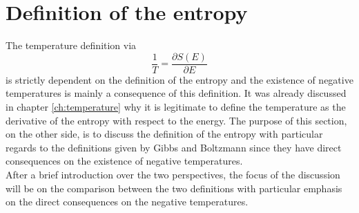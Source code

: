 \chapter{Definition of the entropy}
\label{ch:entropy}
The temperature definition via
\begin{equation*}
    \frac{1}{T} = \frac{\partial S(E)}{\partial E}
\end{equation*}
is strictly dependent on the definition of the entropy and the existence of negative temperatures is mainly a consequence of this definition. 
It was already discussed in chapter \ref{ch:temperature} why it is legitimate to define the temperature as the derivative of the entropy with respect to the energy. The purpose of this section, on the other side,
is to discuss the definition of the entropy with particular regards to the definitions given by Gibbs and Boltzmann since they have direct consequences on the existence of negative temperatures. \\
After a brief introduction over the two perspectives, the focus of the discussion will be on the comparison between the two definitions with particular emphasis on the direct consequences on the negative temperatures.

